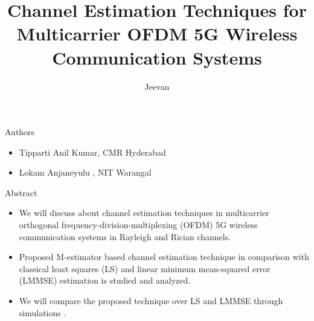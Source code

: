\documentclass{beamer}
\title[M-estimator]{Channel Estimation Techniques for Multicarrier OFDM 5G Wireless Communication Systems} %
\author{Jeevan} %
\institute[IITH] %
{
IITH\\ %

CS20BTECH11047
}
\date{} %
\begin{document}
\begin{frame}
\titlepage %
\end{frame}


\begin{frame}{}

\begin{block}{Authors}
\begin{itemize}
    \item Tipparti Anil Kumar, CMR Hyderabad
    \item Lokam Anjaneyulu , NIT Warangal
\end{itemize}
\end{block}

\begin{block}{Abstract}
\begin{itemize}
    \item We will discuss about channel estimation techniques in multicarrier 
orthogonal frequency-division-multiplexing (OFDM) 5G 
wireless communication systems in Rayleigh and Rician 
channels.
    \item Proposed M-estimator based channel estimation 
technique in comparison with classical least squares (LS) and 
linear minimum mean-squared error (LMMSE) estimation is 
studied and analyzed.
\item We will compare the proposed technique over LS and LMMSE through simulations .
\end{itemize}


\end{block}
    
\end{frame}
\end{document}
